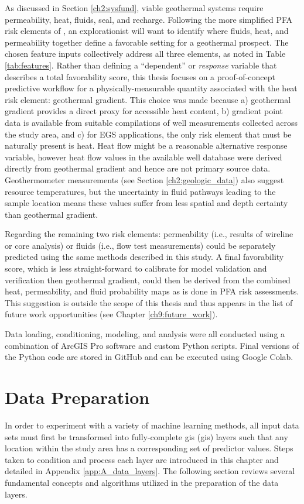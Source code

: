 As discussed in Section \ref{ch2:sysfund}, viable geothermal systems require permeability, heat, fluids, seal, and recharge. Following the more simplified PFA risk elements of \citet{bielicki_hydrogeolgic_2015}, an explorationist will want to identify where fluids, heat, and permeability together define a favorable setting for a geothermal prospect. The chosen feature inputs collectively address all three elements, as noted in Table \ref{tab:features}. Rather than defining a ``dependent'' or \textit{response} variable that describes a total favorability score, this thesis focuses on a proof-of-concept predictive workflow for a physically-measurable quantity associated with the heat risk element: geothermal gradient. This choice was made because a) geothermal gradient provides a direct proxy for accessible heat content, b) gradient point data is available from suitable compilations of well measurements collected across the study area, and c) for EGS applications, the only risk element that must be naturally present is heat. Heat flow might be a reasonable alternative response variable, however heat flow values in the available well database were derived directly from geothermal gradient and hence are not primary source data. Geothermometer measurements (see Section \ref{ch2:geologic_data}) also suggest resource temperatures, but the uncertainty in fluid pathways leading to the sample location means these values suffer from less spatial and depth certainty than geothermal gradient.

Regarding the remaining two risk elements: permeability (i.e., results of wireline or core analysis) or fluids (i.e., flow test measurements) could be separately predicted using the same methods described in this study. A final favorability score, which is less straight-forward to calibrate for model validation and verification then geothermal gradient, could then be derived from the combined heat, permeability, and fluid probability maps as is done in PFA risk assessments. This suggestion is outside the scope of this thesis and thus appears in the list of future work opportunities (see Chapter \ref{ch9:future_work}).

Data loading, conditioning, modeling, and analysis were all conducted using a combination of ArcGIS Pro software and custom Python scripts. Final versions of the Python code are stored in GitHub and can be executed using Google Colab.
\vfill

\section{Data Preparation}\label{ch3:data_prep}
In order to experiment with a variety of machine learning methods, all input data sets must first be transformed into fully-complete \acrlong{gis} (\acrshort{gis}) layers such that any location within the study area has a corresponding set of predictor values. Steps taken to condition and process each layer are introduced in this chapter and detailed in Appendix \ref{app:A_data_layers}. The following section reviews several fundamental concepts and algorithms utilized in the preparation of the data layers.

